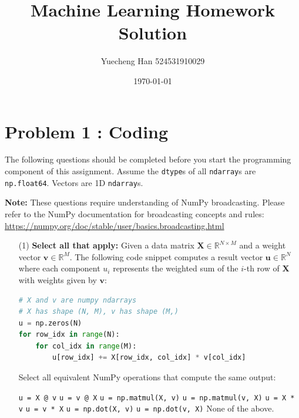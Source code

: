 \documentclass[11pt,addpoints,answers]{exam}
\title{\textbf{Machine Learning Homework Solution}}
\author{Yuecheng Han 524531910029}
\date{\today}
\newcommand{\vv}{\mathbf{v}}
\newcommand{\uv}{\mathbf{u}}
\newcommand{\Xv}{\mathbf{X}}
\newcommand{\sall}{\textbf{Select all that apply: }}
\begin{document}
	\section*{Problem 1 : Coding}
	\label{sec:pseudocode}
	
	The following questions should be completed before you start the programming component of this assignment. Assume the \texttt{dtype}s of all \texttt{ndarray}s are \texttt{np.float64}. Vectors are 1D \texttt{ndarray}s.
	
	\textbf{Note:} These questions require understanding of NumPy broadcasting. Please refer to the NumPy documentation for broadcasting concepts and rules: \url{https://numpy.org/doc/stable/user/basics.broadcasting.html}
	
	\begin{enumerate}[label=\alph*), itemsep=10pt]
		\item[(1)] \sall Given a data matrix $\Xv \in \mathbb{R}^{N \times M}$ and a weight vector $\vv \in \mathbb{R}^M$. The following code snippet computes a result vector $\uv \in \mathbb{R}^N$ where each component $u_i$ represents the weighted sum of the $i$-th row of $\Xv$ with weights given by $\vv$:
		\begin{lstlisting}[language=Python,escapechar=@]
# X and v are numpy ndarrays
# X has shape (N, M), v has shape (M,)
u = np.zeros(N)
for row_idx in range(N):
	for col_idx in range(M):
		u[row_idx] += X[row_idx, col_idx] * v[col_idx]
		\end{lstlisting}
		\vspace*{-2.5mm}
		Select all equivalent NumPy operations that compute the same output:
		
		{%
				\checkboxchar{$\Box$} \checkedchar{$\blacksquare$}
			\begin{checkboxes}
				\CorrectChoice \texttt{u = X @ v}
				\choice \texttt{u = v @ X}
				\CorrectChoice \texttt{u = np.matmul(X, v)}
				\choice \texttt{u = np.matmul(v, X)}
				\choice \texttt{u = X * v}
				\choice \texttt{u = v * X}
				\CorrectChoice \texttt{u = np.dot(X, v)}
				\choice \texttt{u = np.dot(v, X)}
				\choice None of the above.
			\end{checkboxes}
		}
		
		
		

\end{enumerate}
\end{document}

